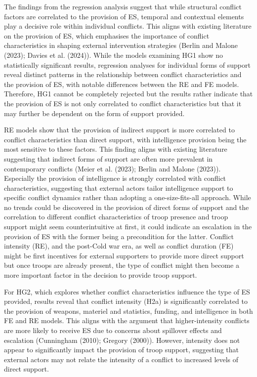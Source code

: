 \documentclass[
]{article}
\begin{document}
The findings from the regression analysis suggest that while structural
conflict factors are correlated to the provision of ES, temporal and
contextual elements play a decisive role within individual conflicts.
This aligns with existing literature on the provision of ES, which
emphasises the importance of conflict characteristics in shaping
external intervention strategies (Berlin and Malone (2023); Davies et
al. (2024)). While the models examining HG1 show no statistically
significant results, regression analyses for individual forms of support
reveal distinct patterns in the relationship between conflict
characteristics and the provision of ES, with notable differences
between the RE and FE models. Therefore, HG1 cannot be completely
rejected but the results rather indicate that the provision of ES is not
only correlated to conflict characteristics but that it may further be
dependent on the form of support provided.

RE models show that the provision of indirect support is more correlated
to conflict characteristics than direct support, with intelligence
provision being the most sensitive to these factors. This finding aligns
with existing literature suggesting that indirect forms of support are
often more prevalent in contemporary conflicts (Meier et al. (2023);
Berlin and Malone (2023)). Especially the provision of intelligence is
strongly correlated with conflict characteristics, suggesting that
external actors tailor intelligence support to specific conflict
dynamics rather than adopting a one-size-fits-all approach. While no
trends could be discovered in the provision of direct forms of support
and the correlation to different conflict characteristics of troop
presence and troop support might seem counterintuitive at first, it
could indicate an escalation in the provision of ES with the former
being a precondition for the latter. Conflict intensity (RE), and the
post-Cold war era, as well as conflict duration (FE) might be first
incentives for external supporters to provide more direct support but
once troops are already present, the type of conflict might then become
a more important factor in the decision to provide troop support.

For HG2, which explores whether conflict characteristics influence the
type of ES provided, results reveal that conflict intensity (H2a) is
significantly correlated to the provision of weapons, materiel and
statistics, funding, and intelligence in both FE and RE models. This
aligns with the argument that higher-intensity conflicts are more likely
to receive ES due to concerns about spillover effects and escalation
(Cunningham (2010); Gregory (2000)). However, intensity does not appear
to significantly impact the provision of troop support, suggesting that
external actors may not relate the intensity of a conflict to increased
levels of direct support.
\end{document}
